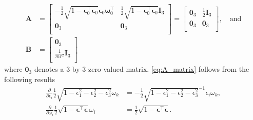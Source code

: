 \begin{align}
\label{eq:A_matrix}
\mathbf{A}
&= \begin{bmatrix}
-\frac{1}{2}\sqrt{1-\boldsymbol{\epsilon}_0^\top\boldsymbol{\epsilon}_0}\boldsymbol{\epsilon}_0\boldsymbol{\omega}_0^\top & \frac{1}{2}\sqrt{1-\boldsymbol{\epsilon}_0^\top\boldsymbol{\epsilon}_0}\mathbf{I}_3\\
\mathbf{0}_3 & \mathbf{0}_3 \\
\end{bmatrix}
= \begin{bmatrix}
\mathbf{0}_3 & \frac{1}{2}\mathbf{I}_3 \\
\mathbf{0}_3 & \mathbf{0}_3 \\
\end{bmatrix}, \quad \text{and} \\
\mathbf{B}
\label{eq:B_matrix}
&= \begin{bmatrix}
\mathbf{0}_3\\
\frac{1}{mr^2}\mathbf{I}_3\\
\end{bmatrix}
\end{align}
where $\mathbf{0}_3$ denotes a 3-by-3 zero-valued matrix. \eqref{eq:A_matrix} follows from the following results
\begin{align}
\frac{\partial}{\partial \epsilon_i}\frac{1}{2}\sqrt{1-\epsilon_1^2 - \epsilon_2^2 - \epsilon_3^2}\omega_k
&= -\frac{1}{2}\sqrt{1-\epsilon_1^2 - \epsilon_2^2 - \epsilon_3^2}^{-1}\epsilon_i \omega_k, \\
\frac{\partial}{\partial \omega_i}\frac{1}{2}\sqrt{1-\boldsymbol{\epsilon}^\top\boldsymbol{\epsilon}}\omega_i
&=\frac{1}{2}\sqrt{1-\boldsymbol{\epsilon}^\top\boldsymbol{\epsilon}}.
\end{align}


